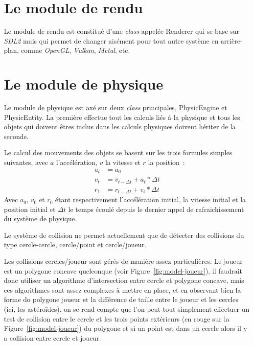 \documentclass[10pt, french, a4paper]{report}
\newcommand{\class}[1]{{\codefont \NoAutoSpacing \mbox{#1}}}
\begin{document}
\section{Le module de rendu}

Le module de rendu est constitué d'une \textit{class} appelée \class{Renderer} qui 
se base sur \textit{SDL2} mais qui permet de changer aisément pour tout autre 
système en arrière-plan, comme \textit{OpenGL}, \textit{Vulkan}, \textit{Metal}, etc. 


\section{Le module de physique}

Le module de physique est axé sur deux \textit{class} principales, 
\class{PhysicEngine} et \\ \class{PhysicEntity}. 
La première effectue tout les calculs liés à la physique et 
tous les objets qui doivent êtres inclus dans les calculs physiques doivent hériter
de la seconde.

Le calcul des mouvements des objets se basent sur les trois formules simples suivantes,
avec $a$ l'accélération, $v$ la vitesse et $r$ la position~:
\begin{align}
	a_t &= a_0\\
	v_t &= v_{t-\Delta t} + a_t * \Delta t\\
	r_t &= r_{t-\Delta t} + v_t * \Delta t
\end{align}
Avec $a_0$, $v_0$ et $r_0$ étant respectivement l'accélération initial, la vitesse 
initial et la position initial et $\Delta t$ le temps écoulé depuis le dernier 
appel de rafraichissement du système de physique.

Le système de collision ne permet actuellement que de détecter des collisions du type
cercle-cercle, cercle/point et cercle/joueur.

Les collisions cercles/joueur sont gérés de manière assez particulières. 
Le joueur est un polygone concave quelconque (voir Figure~\ref{fig:model-joueur}), 
il faudrait donc utiliser un algorithme d'intersection entre cercle et polygone concave,
mais ces algorithmes sont assez complexes à mettre en place, et en observant bien la 
forme do polygone joueur et la différence de taille entre le joueur et les cercles 
(ici, les astéroïdes), on se rend compte que l'on peut tout simplement effectuer un 
test de collision entre le cercle et les trois points \og extérieurs \fg{} (en rouge sur la Figure~\ref{fig:model-joueur}) du polygone et si un point est dans un cercle
alors il y a collision entre cercle et joueur.
\end{document}
